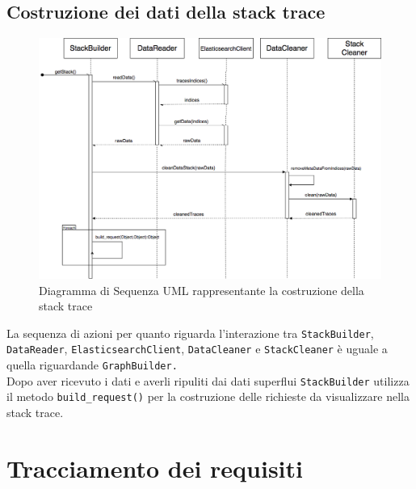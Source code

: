 \subsection{Costruzione dei dati della stack trace}
\begin{figure}[H]
	\centering
	\includegraphics[width=1\textwidth]{Images/DiagrammaSequenzaStack.png}
	\caption{Diagramma di Sequenza UML rappresentante la costruzione della stack trace}
	\label{img:seqGraphstack}
\end{figure}
La sequenza di azioni per quanto riguarda l'interazione tra \texttt{StackBuilder}, \texttt{DataReader}, \texttt{ElasticsearchClient}, \texttt{DataCleaner} e \texttt{StackCleaner} è uguale a quella riguardande \texttt{GraphBuilder.}\\
Dopo aver ricevuto i dati e averli ripuliti dai dati superflui \texttt{StackBuilder} utilizza il metodo \texttt{build\_request()} per la costruzione delle richieste da visualizzare nella stack trace.


\section{Tracciamento dei requisiti}
\label{sec:Tracciamento}

